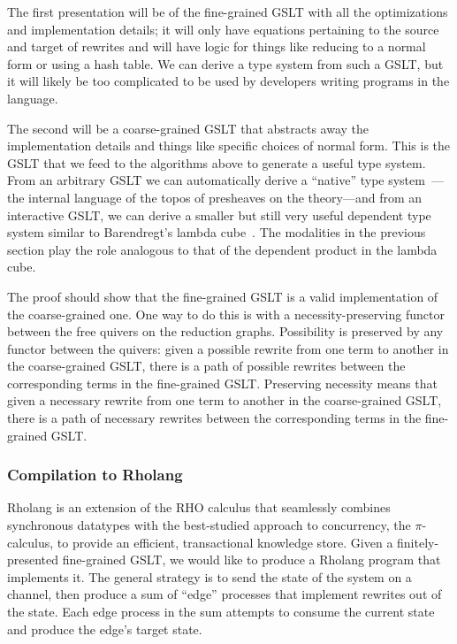 \documentclass{article}
\begin{document}
The first presentation will be of the fine-grained GSLT with all the optimizations and implementation details; it will only have equations pertaining to the source and target of rewrites and will have logic for things like reducing to a normal form or using a hash table.  We can derive a type system from such a GSLT, but it will likely be too complicated to be used by developers writing programs in the language.

The second will be a coarse-grained GSLT that abstracts away the implementation details and things like specific choices of normal form.  This is the GSLT that we feed to the algorithms above to generate a useful type system.  From an arbitrary GSLT we can automatically derive a ``native'' type system~\cite{WilliamsStay2021}---the internal language of the topos of presheaves on the theory---and from an interactive GSLT, we can derive a smaller but still very useful dependent type system similar to Barendregt's lambda cube~\cite{HypercubePaper}.  The modalities in the previous section play the role analogous to that of the dependent product in the lambda cube.

The proof should show that the fine-grained GSLT is a valid implementation of the coarse-grained one.  One way to do this is with a necessity-preserving functor between the free quivers on the reduction graphs.  Possibility is preserved by any functor between the quivers: given a possible rewrite from one term to another in the coarse-grained GSLT, there is a path of possible rewrites between the corresponding terms in the fine-grained GSLT.  Preserving necessity means that given a necessary rewrite from one term to another in the coarse-grained GSLT, there is a path of necessary rewrites between the corresponding terms in the fine-grained GSLT.

\subsubsection{Compilation to Rholang}
\label{comp_to_rholang}

Rholang is an extension of the RHO calculus that seamlessly combines synchronous datatypes with the best-studied approach to concurrency, the $\pi$-calculus, to provide an efficient, transactional knowledge store.  Given a finitely-presented fine-grained GSLT, we would like to produce a Rholang program that implements it.  The general strategy is to send the state of the system on a channel, then produce a sum of ``edge'' processes that implement rewrites out of the state.  Each edge process in the sum attempts to consume the current state and produce the edge's target state.
\end{document}
